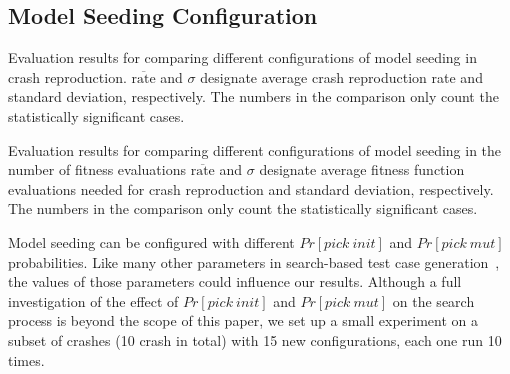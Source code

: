 \subsection{Model Seeding Configuration}

\begin{table}[t]
	\center
	\caption{Evaluation results for comparing different configurations of model seeding in crash reproduction. $\overline{\text{rate}}$ and $\sigma$  designate average crash reproduction rate and standard deviation, respectively. The numbers in the comparison only count the statistically significant cases.}
	\label{tab:additional-expe-repr-table}
    \begin{footnotesize}
	
    \end{footnotesize}
\end{table}

\begin{table*} [t]
	\center
	\caption{Evaluation results for comparing different configurations of model seeding in the number of fitness evaluations $\overline{\text{rate}}$ and $\sigma$  designate average fitness function evaluations needed for crash reproduction and standard deviation, respectively. The numbers in the comparison only count the statistically significant cases.}
	\label{tab:additional-expe-ff-evals-table}
	\begin{footnotesize}
	
	\end{footnotesize}
\end{table*}

Model seeding can be configured with different $Pr[pick\ init]$ and $Pr[pick\ mut]$ probabilities. Like many other parameters in search-based test case generation~\cite{Arcuri2013}, the values of those parameters could influence our results.
Although a full investigation of the effect of $Pr[pick\ init]$ and $Pr[pick\ mut]$ on the search process is beyond the scope of this paper, we set up a small experiment on a subset of crashes (10 crash in total) with 15 new configurations, each one run 10 times.

